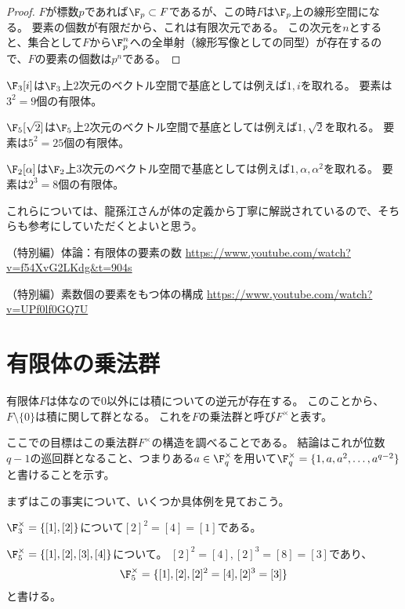 \documentclass[uplatex]{jsarticle}
\begin{document}
\begin{proof}
  $F$が標数$p$であれば$\F_p\subset F$であるが、この時$F$は$\F_p$上の線形空間になる。
  要素の個数が有限だから、これは有限次元である。
  この次元を$n$とすると、集合として$F$から$\F_p^n$への全単射（線形写像としての同型）が存在するので、$F$の要素の個数は$p^n$である。
\end{proof}

\begin{eg}
  $\F_3[i]$は$\F_3$上$2$次元のベクトル空間で基底としては例えば$1,i$を取れる。
  要素は$3^2=9$個の有限体。
\end{eg}

\begin{eg}
  $\F_5[\sqrt{2}]$は$\F_5$上$2$次元のベクトル空間で基底としては例えば$1,\sqrt{2}$を取れる。
  要素は$5^2=25$個の有限体。
\end{eg}

\begin{eg}
  $\F_2[\alpha]$は$\F_2$上$3$次元のベクトル空間で基底としては例えば$1,\alpha,\alpha^2$を取れる。
  要素は$2^3=8$個の有限体。
\end{eg}

これらについては、龍孫江さんが体の定義から丁寧に解説されているので、そちらも参考にしていただくとよいと思う。

（特別編）体論：有限体の要素の数
\url{https://www.youtube.com/watch?v=f54XvG2LKdg&t=904s}

（特別編）素数個の要素をもつ体の構成
\url{https://www.youtube.com/watch?v=UPf0lf0GQ7U}

\section{有限体の乗法群}

有限体$F$は体なので$0$以外には積についての逆元が存在する。
このことから、$F\setminus\{0\}$は積に関して群となる。
これを$F$の乗法群と呼び$F^\times$と表す。

ここでの目標はこの乗法群$F^\times$の構造を調べることである。
結論はこれが位数$q-1$の巡回群となること、つまりある$a\in\F_q^\times$を用いて$\F_q^\times=\{1,a,a^2,\ldots,a^{q-2}\}$と書けることを示す。


まずはこの事実について、いくつか具体例を見ておこう。
\begin{eg}
  $\F_3^\times=\{[1],[2]\}$について$[2]^2=[4]=[1]$である。
\end{eg}

\begin{eg}
  $\F_5^\times=\{[1],[2],[3],[4]\}$について。
  $[2]^2=[4], [2]^3=[8]=[3]$であり、
  \begin{align*}
    \F_5^\times=\{[1],[2],[2]^2=[4],[2]^3=[3]\}
  \end{align*}
  と書ける。
\end{eg}
\end{document}

